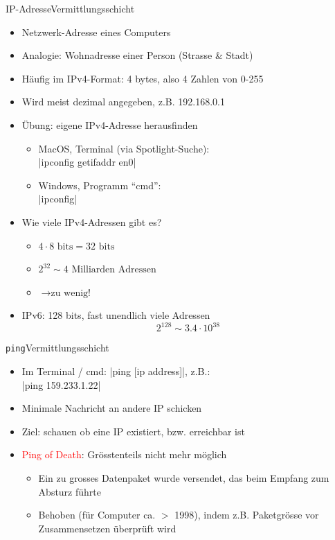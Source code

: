 
\begin{frame}[fragile]{\faMapMarker{} IP-Adresse}{Vermittlungsschicht}

\begin{itemize}[<+->]
\item Netzwerk-Adresse eines Computers
\item Analogie: Wohnadresse einer Person (Strasse \& Stadt)
\item Häufig im IPv4-Format: 4 bytes, also 4 Zahlen von 0-255
\item Wird meist dezimal angegeben, z.B. 192.168.0.1
\item Übung: eigene IPv4-Adresse herausfinden
\begin{itemize}
\item MacOS, Terminal (via Spotlight-Suche): \\
\commandbox|ipconfig getifaddr en0|
\item Windows, Programm ``cmd'': \\
\commandbox|ipconfig|
\end{itemize}
\item Wie viele IPv4-Adressen gibt es?
\begin{itemize}
\item $4\cdot 8 \text{ bits} = 32 \text{ bits}$
\item $2^{32} \sim 4 \text{ Milliarden Adressen}$
\item $\rightarrow \text{zu wenig!}$
\end{itemize}
\item IPv6: 128 bits, fast unendlich viele Adressen
\[2^{128} \sim 3.4\cdot 10^{38}\]
\end{itemize}
\end{frame}

\begin{frame}[fragile]{\faCompass{} \texttt{ping}}{Vermittlungsschicht}

\begin{itemize}[<+->]
\item Im Terminal / cmd: \commandbox|ping [ip address]|, z.B.:\\
\commandbox|ping 159.233.1.22|
\item Minimale Nachricht an andere IP schicken
\item Ziel: schauen ob eine IP existiert, bzw. erreichbar ist
\item \textcolor{red}{\faSkull{} Ping of Death}: Grösstenteils nicht mehr möglich
\begin{itemize}
\item Ein zu grosses Datenpaket wurde versendet, das beim Empfang zum Absturz führte
\item Behoben (für Computer ca. $>$ 1998), indem z.B. Paketgrösse vor Zusammensetzen überprüft wird
\end{itemize}
\end{itemize}
\end{frame}

